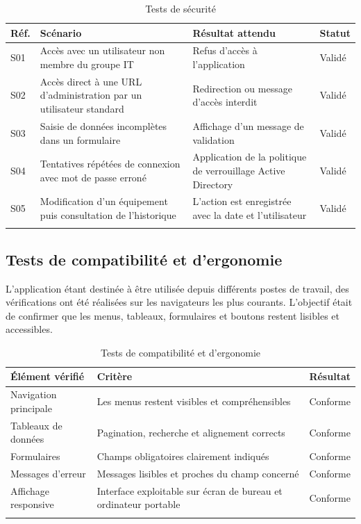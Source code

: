 \begin{longtable}{|m{1.5cm}|m{5cm}|m{4cm}|m{3cm}|}
\hline
\textbf{Réf.} & \textbf{Scénario} & \textbf{Résultat attendu} & \textbf{Statut} \\
\hline
\endhead
\endfoot
\endlastfoot
\hline
S01 & Accès avec un utilisateur non membre du groupe IT & Refus d'accès à l'application & Validé \\
\hline
S02 & Accès direct à une URL d'administration par un utilisateur standard & Redirection ou message d'accès interdit & Validé \\
\hline
S03 & Saisie de données incomplètes dans un formulaire & Affichage d'un message de validation & Validé \\
\hline
S04 & Tentatives répétées de connexion avec mot de passe erroné & Application de la politique de verrouillage Active Directory & Validé \\
\hline
S05 & Modification d'un équipement puis consultation de l'historique & L'action est enregistrée avec la date et l'utilisateur & Validé \\
\hline
\captionsetup{justification=centering,margin=1cm}
\caption{Tests de sécurité}
\end{longtable}

\subsection{Tests de compatibilité et d'ergonomie}

L'application étant destinée à être utilisée depuis différents postes de travail, des vérifications ont été réalisées sur les navigateurs les plus courants. L'objectif était de confirmer que les menus, tableaux, formulaires et boutons restent lisibles et accessibles.

\begin{longtable}{|m{4cm}|m{5cm}|m{4cm}|}
\hline
\textbf{Élément vérifié} & \textbf{Critère} & \textbf{Résultat} \\
\hline
\endhead
\endfoot
\endlastfoot
\hline
Navigation principale & Les menus restent visibles et compréhensibles & Conforme \\
\hline
Tableaux de données & Pagination, recherche et alignement corrects & Conforme \\
\hline
Formulaires & Champs obligatoires clairement indiqués & Conforme \\
\hline
Messages d'erreur & Messages lisibles et proches du champ concerné & Conforme \\
\hline
Affichage responsive & Interface exploitable sur écran de bureau et ordinateur portable & Conforme \\
\hline
\captionsetup{justification=centering,margin=1cm}
\caption{Tests de compatibilité et d'ergonomie}
\end{longtable}

